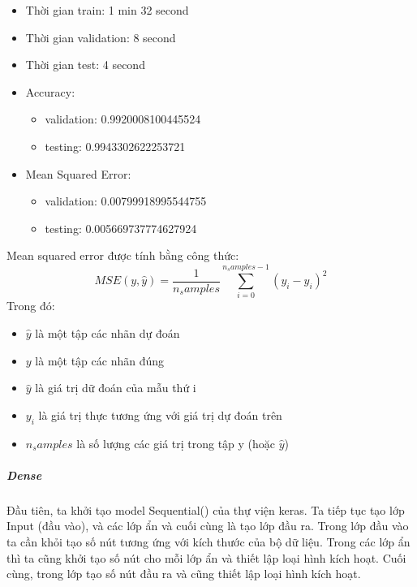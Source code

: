 \documentclass{article}
\begin{document}
\begin{enumerate}
	      \begin{itemize}
		      \item Thời gian train: 1 min 32 second
		      \item Thời gian validation: 8 second
		      \item Thời gian test: 4 second
		      \item Accuracy:
		            \begin{itemize}
			            \item validation: 0.9920008100445524
			            \item testing: 0.9943302622253721
		            \end{itemize}
		      \item Mean Squared Error:
		            \begin{itemize}
			            \item validation: 0.00799918995544755
			            \item testing: 0.005669737774627924
		            \end{itemize}
	      \end{itemize}
\end{enumerate}

Mean squared error được tính bằng công thức:
\begin{equation}
	MSE(y,\widehat{y}) = \frac{1}{n_samples} \sum_{i = 0}^{n_samples-1} (y_i - \widehat{y}_i)^2
\end{equation}
Trong đó:
\begin{itemize}
	\item $\widehat{y}$ là một tập các nhãn dự đoán
	\item $y$ là một tập các nhãn đúng
	\item $\widehat{y}$ là giá trị dữ đoán của mẫu thứ i
	\item $y_i$ là giá trị thực tương ứng với giá trị dự đoán trên
	\item $n_samples$ là số lượng các giá trị trong tập y (hoặc $\widehat{y}$)
\end{itemize}

\subparagraph{Dense}

Đầu tiên, ta khởi tạo model Sequential() của thự viện keras. Ta tiếp tục tạo lớp Input (đầu vào), và các lớp ẩn và cuối cùng là tạo lớp đầu ra. Trong lớp đầu vào ta cần khỏi tạo số nút tương ứng với kích thước của bộ dữ liệu. Trong các lớp ẩn thì ta cũng khởi tạo số nút cho mỗi lớp ẩn và thiết lập loại hình kích hoạt. Cuối cùng, trong lớp tạo số nút đầu ra và cũng thiết lập loại hình kích hoạt.
\end{document}
